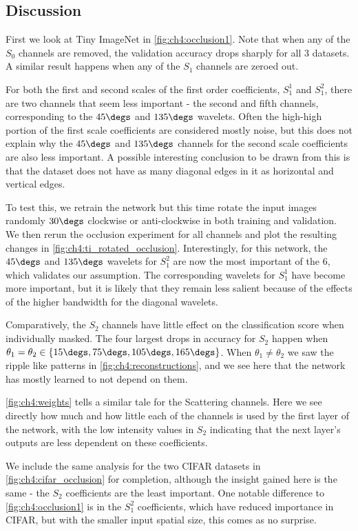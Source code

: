 \subsection{Discussion}
First we look at Tiny ImageNet in \autoref{fig:ch4:occlusion1}.
Note that when any of the $S_0$ channels are removed, 
the validation accuracy drops sharply for all 3 datasets. A similar result
happens when any of the $S_1$ channels are zeroed out. 

For both the first and second scales of the first order coefficients, 
$S_1^1$ and $S_1^2$, there are two channels that seem less
important - the second and fifth channels, corresponding to the $45\degs$ and
$135\degs$ wavelets. Often the high-high portion of the first scale coefficients
are considered mostly noise, but this does not explain why the $45\degs$
and $135\degs$ channels for the second scale coefficients are also less
important. A possible interesting conclusion to be drawn from this is that the
dataset does not have as many diagonal edges in it as horizontal and vertical
edges. 

To test this, we retrain the network but this time rotate the input
images randomly $30\degs$ clockwise or anti-clockwise in both training and
validation. We then rerun the occlusion experiment for all channels and plot the
resulting changes in \autoref{fig:ch4:ti_rotated_occlusion}. Interestingly, for
this network, the $45\degs$ and $135\degs$ wavelets for $S_1^2$ are now the most
important of the 6, which validates our assumption. The corresponding wavelets
for $S_1^1$ have become more important, but it is likely that they remain less
salient because of the effects of the higher bandwidth for the diagonal
wavelets.

Comparatively, the $S_2$ channels have little effect on the classification score
when individually masked. The four largest drops in accuracy for
$S_2$ happen when $\theta_1 = \theta_2 \in \{15\degs, 75\degs, 105\degs, 165\degs\}$.
When $\theta_1 \neq \theta_2$ we saw the ripple like patterns in
\autoref{fig:ch4:reconstructions}, and we see here that the network has mostly
learned to not depend on them.

\autoref{fig:ch4:weights} tells a similar tale for the Scattering channels. Here
we see directly how much and how little each of the channels is used by the
first layer of the network, with the low intensity values in $S_2$ indicating that the
next layer's outputs are less dependent on these coefficients.

We include the same analysis for the two CIFAR datasets in
\autoref{fig:ch4:cifar_occlusion} for completion, although the insight gained
here is the same - the $S_2$ coefficients are the least important. One notable difference to
\autoref{fig:ch4:occlusion1} is in the $S_1^2$ coefficients, which have reduced importance 
in CIFAR, but with the smaller input spatial size, this comes as no surprise.

